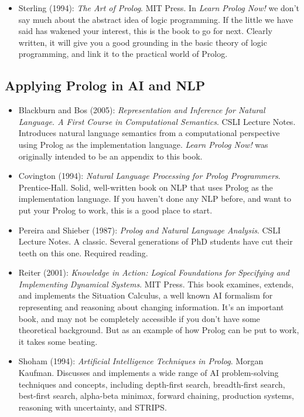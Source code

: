 \begin{itemize}
\item Sterling (1994): \textit{The Art of Prolog}. MIT Press.  In \textit{Learn
Prolog Now!} we don't say much about the abstract idea of logic programming. If
the little we have said has wakened your interest, this is the
book to go for next. Clearly written, it will give you a good grounding in the
basic theory of logic programming, and link it to the practical world of
Prolog.

\end{itemize}






\subsection*{Applying Prolog in AI and NLP}

\begin{itemize}

\item Blackburn and Bos (2005): \textit{Representation and Inference
      for Natural Language. A First Course in Computational
      Semantics}. CSLI Lecture Notes. Introduces natural language
      semantics from a computational perspective using Prolog as the
      implementation language.  \textit{Learn Prolog Now!} was
      originally intended to be an appendix to this book.


\item Covington (1994): \textit{Natural Language Processing for Prolog
Programmers}. Prentice-Hall. Solid, well-written book on NLP that uses Prolog
as the implementation language. If you haven't done any NLP before, and want to
put your Prolog to work, this is a good place to start.

\item Pereira and Shieber (1987): \textit{Prolog and Natural Language
  Analysis}. CSLI Lecture Notes. A classic. Several generations of PhD
  students have cut their teeth on this one. Required reading.

\item Reiter (2001): \textit{Knowledge in Action: Logical Foundations for
 Specifying and Implementing Dynamical Systems}. MIT Press.  This book
 examines, extends, and implements the Situation Calculus, a well known AI
 formalism for representing and reasoning about changing information.  It's an
 important book, and may not be completely accessible if you don't have some
 theoretical background. But as an example of how Prolog can be put to work, it
 takes some beating.

\item Shoham (1994): \textit{Artificial Intelligence Techniques in
Prolog}. Morgan Kaufman.  Discusses and implements a wide range of AI
problem-solving techniques and concepts, including depth-first search,
breadth-first search, best-first search, alpha-beta minimax, forward chaining,
production systems, reasoning with uncertainty, and STRIPS.

\end{itemize}
